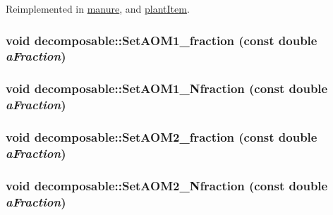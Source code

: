 Reimplemented in \hyperlink{classmanure_a0bf5e3b02282ec2a7d265e04e2c3f561}{manure}, and \hyperlink{classplant_item_a6ed5a9408b471bb44246e5c50e93b72f}{plantItem}.\hypertarget{classdecomposable_ac407a798cfcb99145d49bcd70248a0a7}{
\subsubsection[{SetAOM1\_\-fraction}]{\setlength{\rightskip}{0pt plus 5cm}void decomposable::SetAOM1\_\-fraction (const double {\em aFraction})}}
\label{classdecomposable_ac407a798cfcb99145d49bcd70248a0a7}
\hypertarget{classdecomposable_a3fff0175a3c8479d6f9e87251638e030}{
\subsubsection[{SetAOM1\_\-Nfraction}]{\setlength{\rightskip}{0pt plus 5cm}void decomposable::SetAOM1\_\-Nfraction (const double {\em aFraction})}}
\label{classdecomposable_a3fff0175a3c8479d6f9e87251638e030}
\hypertarget{classdecomposable_af5a80ec735ea7df5699127e289e70409}{
\subsubsection[{SetAOM2\_\-fraction}]{\setlength{\rightskip}{0pt plus 5cm}void decomposable::SetAOM2\_\-fraction (const double {\em aFraction})}}
\label{classdecomposable_af5a80ec735ea7df5699127e289e70409}
\hypertarget{classdecomposable_a9df0927068758ebb7dc75375b241c14f}{
\subsubsection[{SetAOM2\_\-Nfraction}]{\setlength{\rightskip}{0pt plus 5cm}void decomposable::SetAOM2\_\-Nfraction (const double {\em aFraction})}}

